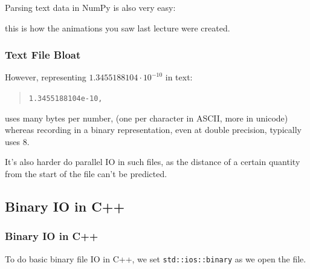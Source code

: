 Parsing text data in NumPy is also very easy:

\begin{Shaded}
\begin{Highlighting}[]

                \NormalTok{)[:,:-}\NormalTok{]}
\end{Highlighting}
\end{Shaded}

\begin{Shaded}
\begin{Highlighting}[]

\end{Highlighting}
\end{Shaded}

this is how the animations you saw last lecture were created.

\subsubsection{Text File Bloat}\label{text-file-bloat}

However, representing $1.3455188104 \cdot 10^{-10}$ in text:

\begin{quote}
\texttt{1.3455188104e-10,}
\end{quote}

uses many bytes per number, (one per character in ASCII, more in
unicode) whereas recording in a binary representation, even at double
precision, typically uses 8.

It's also harder do parallel IO in such files, as the distance of a
certain quantity from the start of the file can't be predicted.

\subsection{Binary IO in C++}\label{binary-io-in-c}

\subsubsection{Binary IO in C++}\label{binary-io-in-c-1}

To do basic binary file IO in C++, we set \texttt{std::ios::binary} as
we open the file.


